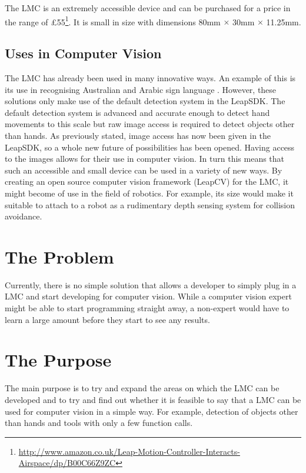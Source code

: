 \documentclass[11pt,oneside]{report}
\begin{document}
				The LMC is an extremely accessible device and can be purchased for a price in the range of \pounds55\footnote{\url{http://www.amazon.co.uk/Leap-Motion-Controller-Interacts-Airspace/dp/B00C66Z9ZC}}.
				It is small in size with dimensions 80mm $\times$ 30mm $\times$ 11.25mm.				

			\subsection{Uses in Computer Vision}
				The LMC has already been used in many innovative ways.
				An example of this is its use in recognising Australian and Arabic sign language \cite{journal:leapSignLanguage,journal:leapSignLanguage2}.
				However, these solutions only make use of the default detection system in the LeapSDK.
				The default detection system is advanced and accurate enough to detect hand movements to this scale but raw image access is required to detect objects other than hands.
				As previously stated, image access has now been given in the LeapSDK, so a whole new future of possibilities has been opened.
				Having access to the images allows for their use in computer vision.
				In turn this means that such an accessible and small device can be used in a variety of new ways.
				By creating an open source computer vision framework (LeapCV) for the LMC, it might become of use in the field of robotics.
				For example, its size would make it suitable to attach to a robot as a rudimentary depth sensing system for collision avoidance.
				
						
		\section{The Problem}
				Currently, there is no simple solution that allows a developer to simply plug in a LMC and start developing for computer vision.
				While a computer vision expert might be able to start programming straight away, a non-expert would have to learn a large amount before they start to see any results.	
				
		\section{The Purpose}
				The main purpose is to try and expand the areas on which the LMC can be developed and to try and find out whether it is feasible to say that a LMC can be used for computer vision in a simple way.
				For example, detection of objects other than hands and tools with only a few function calls.
				
\end{document}
